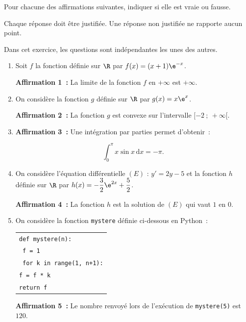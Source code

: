 Pour chacune des affirmations suivantes, indiquer si elle est vraie ou fausse.

Chaque réponse doit être justifiée. Une réponse non justifiée ne rapporte aucun point.

Dans cet exercice, les questions sont indépendantes les unes des autres.

\begin{enumerate}
\item Soit $f$ la fonction définie sur $\R$ par $f(x) = (x + 1)\e^{-x}$.

\textbf{Affirmation 1~:} La limite de la fonction $f$ en $+\infty$ est $+\infty$.

\item On considère la fonction $g$ définie sur $\R$ par $g(x) = x\e^x$.

\textbf{Affirmation 2~:} La fonction $g$ est convexe sur l'intervalle $[-2~;~+\infty[$.

\item \textbf{Affirmation 3~:} Une intégration par parties permet d'obtenir~:

\[\displaystyle\int_{0}^{\pi} x\sin x\,\text{d}x = -\pi.\]

\item On considère l'équation différentielle $(E)$ : $y' = 2y - 5$ et la fonction $h$ définie sur $\R$ par $h(x) = -\dfrac{3}{2}\e^{2x} + \dfrac{5}{2}$.

\textbf{Affirmation 4~:} La fonction $h$ est la solution de $(E)$ qui vaut $1$ en $0$.

\item On considère la fonction \texttt{mystere} définie ci-dessous en Python~:

\begin{center}
\begin{tabular}{|l|}\hline
\texttt{def mystere(n):}\\
\quad \texttt{ f = 1}\\
\quad \texttt{ for k in range(1, n+1):}\\
\quad \quad \texttt{f = f * k}\\
\quad  \texttt{return f}\\ \hline
\end{tabular}
\end{center}

\textbf{Affirmation 5~:} Le nombre renvoyé lors de l'exécution de \texttt{mystere(5)} est $120$.
\end{enumerate}

